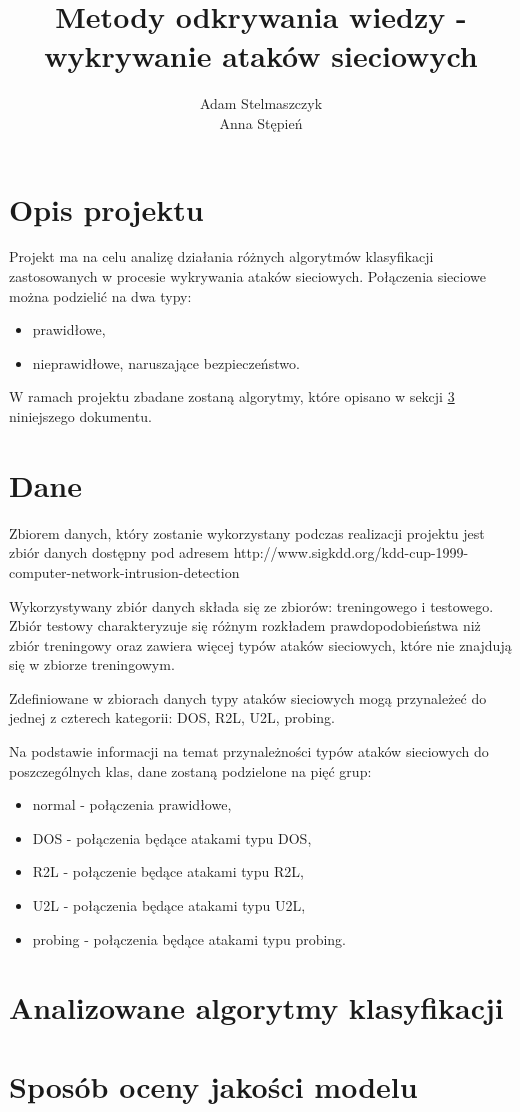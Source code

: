\documentclass[a4paper, 12pt]{article}
\title {Metody odkrywania wiedzy - wykrywanie ataków sieciowych}
\author {Adam Stelmaszczyk\\ Anna Stępień}
\begin{document}
\maketitle

\tableofcontents

\newpage

\section{Opis projektu}
Projekt ma na celu analizę działania różnych algorytmów klasyfikacji zastosowanych
w procesie wykrywania ataków sieciowych. Połączenia sieciowe można podzielić na dwa typy:
\begin{itemize}
	\item prawidłowe,
	\item nieprawidłowe, naruszające bezpieczeństwo.
\end{itemize}
W ramach projektu zbadane zostaną algorytmy, które opisano w sekcji \ref{algorithms} niniejszego dokumentu.

\section{Dane}
Zbiorem danych, który zostanie wykorzystany podczas realizacji projektu jest zbiór danych dostępny pod adresem http://www.sigkdd.org/kdd-cup-1999-computer-network-intrusion-detection

Wykorzystywany zbiór danych składa się ze zbiorów: treningowego i testowego. Zbiór testowy charakteryzuje się różnym rozkładem prawdopodobieństwa niż zbiór treningowy oraz zawiera więcej typów ataków sieciowych, które nie znajdują się w zbiorze treningowym.

Zdefiniowane w zbiorach danych typy ataków sieciowych mogą przynależeć do jednej z czterech kategorii: DOS, R2L, U2L, probing.


Na podstawie informacji na temat przynależności typów ataków sieciowych do poszczególnych klas, dane zostaną podzielone na pięć grup:
\begin{itemize}
	\item normal - połączenia prawidłowe,
	\item DOS - połączenia będące atakami typu DOS,
	\item R2L - połączenie będące atakami typu R2L,
	\item U2L - połączenia będące atakami typu U2L,
	\item probing - połączenia będące atakami typu probing.
\end{itemize}

\section{Analizowane algorytmy klasyfikacji}\label{algorithms}

\section{Sposób oceny jakości modelu}
\end{document}
